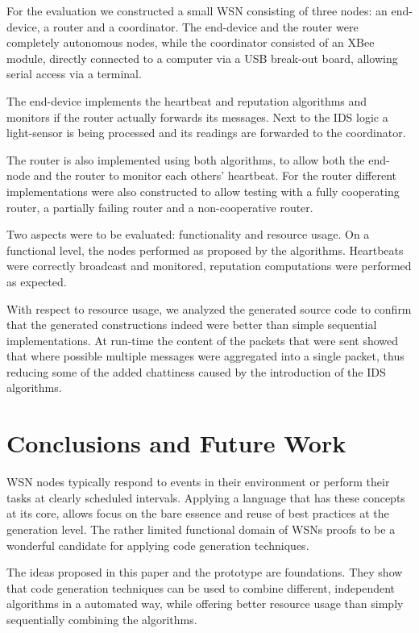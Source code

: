 \documentclass[conference]{IEEEtran}
\begin{document}
For the evaluation we constructed a small WSN consisting of three nodes: an
end-device, a router and a coordinator. The end-device and the router were
completely autonomous nodes, while the coordinator consisted of an XBee module,
directly connected to a computer via a USB break-out board, allowing serial
access via a terminal.

The end-device implements the heartbeat and reputation algorithms and monitors
if the router actually forwards its messages. Next to the IDS logic a
light-sensor is being processed and its readings are forwarded to the
coordinator.

The router is also implemented using both algorithms, to allow both the
end-node and the router to monitor each others' heartbeat. For the router
different implementations were also constructed to allow testing with a fully
cooperating router, a partially failing router and a non-cooperative router.

Two aspects were to be evaluated: functionality and resource usage. On a
functional level, the nodes performed as proposed by the algorithms. Heartbeats
were correctly broadcast and monitored, reputation computations were performed
as expected.

With respect to resource usage, we analyzed the generated source code to
confirm that the generated constructions indeed were better than simple
sequential implementations. At run-time the content of the packets that were
sent showed that where possible multiple messages were aggregated into a single
packet, thus reducing some of the added chattiness caused by the introduction
of the IDS algorithms.

\section{Conclusions and Future Work}
\label{section:conclusions}

WSN nodes typically respond to events in their environment or perform their
tasks at clearly scheduled intervals. Applying a language that has these
concepts at its core, allows focus on the bare essence and reuse of best
practices at the generation level. The rather limited functional domain of WSNs
proofs to be a wonderful candidate for applying code generation techniques.

The ideas proposed in this paper and the prototype are foundations. They show
that code generation techniques can be used to combine different, independent
algorithms in a automated way, while offering better resource usage than simply
sequentially combining the algorithms.
\end{document}
